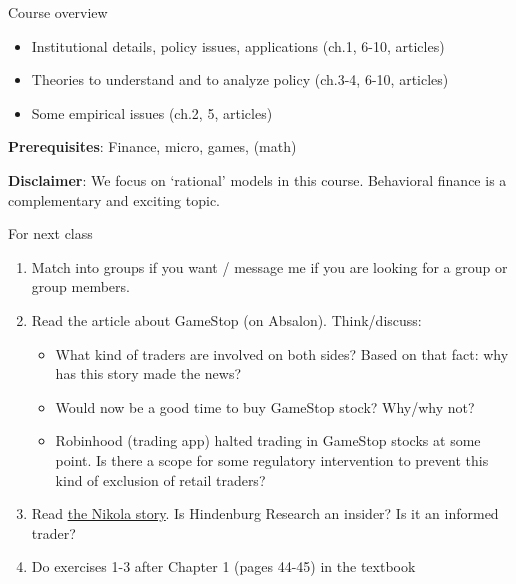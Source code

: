 \documentclass[english,10pt
,aspectratio=169
]{beamer}
\begin{document}
\begin{frame}{Course overview}
	\begin{itemize}
		\item Institutional details, policy issues, applications (ch.1, 6-10, articles)
		\item Theories to understand and to analyze policy (ch.3-4, 6-10, articles)
		\item Some empirical issues (ch.2, 5, articles)
	\end{itemize}
	
	\textbf{Prerequisites}: Finance, micro, games, (math)
	
	\textbf{Disclaimer}: We focus on `rational' models in this course.
	Behavioral finance is a complementary and exciting topic. 
\end{frame}


\begin{frame}{For next class}
\begin{enumerate}
	\item Match into groups if you want / message me if you are looking for a group or group members.
	\item Read the article about GameStop (on Absalon). Think/discuss:
	\begin{itemize}
		\item What kind of traders are involved on both sides? Based on that fact: why has this story made the news?
		\item Would now be a good time to buy GameStop stock? Why/why not?
		\item Robinhood (trading app) halted trading in GameStop stocks at some point. Is there a scope for some regulatory intervention to prevent this kind of exclusion of retail traders?
	\end{itemize} 
	\item Read \href{https://arstechnica.com/cars/2020/09/nikola-stock-falls-25-as-the-company-faces-new-fraud-allegations/}{\underline{the Nikola story}}. Is Hindenburg Research an insider? Is it an informed trader? 
	\item Do exercises 1-3 after Chapter 1 (pages 44-45) in the textbook
\end{enumerate}
\end{frame}
\end{document}
